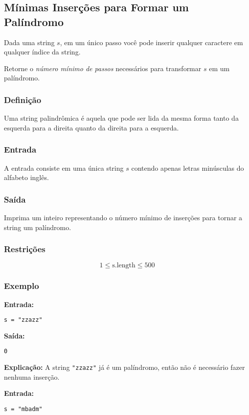 \subsection{Mínimas Inserções para Formar um Palíndromo}

Dada uma string \( s \), em um único passo você pode inserir qualquer caractere em qualquer índice da string.

Retorne o \textit{número mínimo de passos} necessários para transformar \( s \) em um palíndromo.

\subsubsection*{Definição}
Uma string palindrômica é aquela que pode ser lida da mesma forma tanto da esquerda para a direita quanto da direita para a esquerda.

\subsubsection*{Entrada}
A entrada consiste em uma única string \( s \) contendo apenas letras minúsculas do alfabeto inglês.

\subsubsection*{Saída}
Imprima um inteiro representando o número mínimo de inserções para tornar a string um palíndromo.

\subsubsection*{Restrições}
\[
1 \leq \text{s.length} \leq 500
\]

\subsubsection*{Exemplo}

\textbf{Entrada:}
\begin{verbatim}
s = "zzazz"
\end{verbatim}

\textbf{Saída:}
\begin{verbatim}
0
\end{verbatim}

\textbf{Explicação:} A string \texttt{"zzazz"} já é um palíndromo, então não é necessário fazer nenhuma inserção.

\bigskip
\textbf{Entrada:}
\begin{verbatim}
s = "mbadm"
\end{verbatim}

